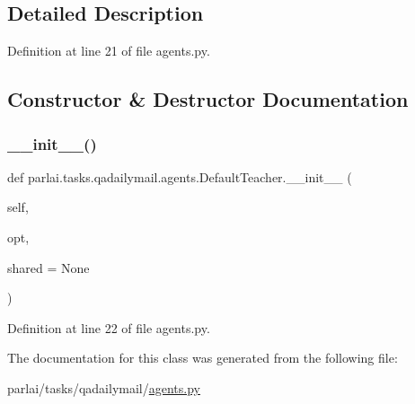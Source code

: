 \subsection{Detailed Description}


Definition at line 21 of file agents.\+py.



\subsection{Constructor \& Destructor Documentation}
\mbox{\label{classparlai_1_1tasks_1_1qadailymail_1_1agents_1_1DefaultTeacher_a9b9a49fa6e1a61092205f2500fe4f933}} 
\subsubsection{\texorpdfstring{\+\_\+\+\_\+init\+\_\+\+\_\+()}{\_\_init\_\_()}}
{\footnotesize\ttfamily def parlai.\+tasks.\+qadailymail.\+agents.\+Default\+Teacher.\+\_\+\+\_\+init\+\_\+\+\_\+ (\begin{DoxyParamCaption}\item[{}]{self,  }\item[{}]{opt,  }\item[{}]{shared = {\ttfamily None} }\end{DoxyParamCaption})}



Definition at line 22 of file agents.\+py.



The documentation for this class was generated from the following file\+:\begin{DoxyCompactItemize}
\item 
parlai/tasks/qadailymail/\hyperlink{parlai_2tasks_2qadailymail_2agents_8py}{agents.\+py}\end{DoxyCompactItemize}
